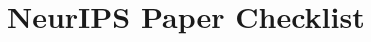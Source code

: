 \documentclass{article}
\begin{document}

\newpage
\section*{NeurIPS Paper Checklist}

\end{document}
